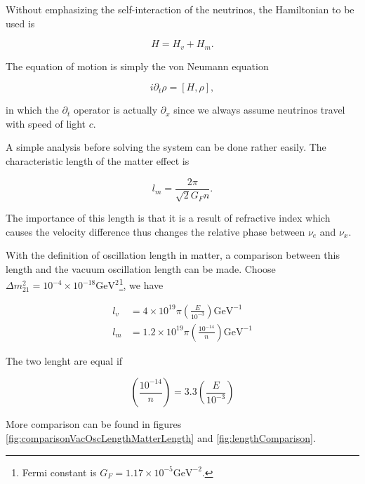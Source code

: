 \documentclass{tufte-handout}
\begin{document}
Without emphasizing the self-interaction of the neutrinos, the Hamiltonian to be used is

\begin{equation}
H = H_v + H_m.
\end{equation}

The equation of motion is simply the von Neumann equation

\begin{equation}
i \partial_t \rho = \left[ H , \rho\right],
\end{equation}

in which the $\partial_t$ operator is actually $\partial_x$ since we always assume neutrinos travel with speed of light $c$.

A simple analysis before solving the system can be done rather easily. The characteristic length of the matter effect is

\begin{equation*}
l_m = \frac{2\pi}{\sqrt{2}G_F n} .
\end{equation*}

The importance of this length is that it is a result of refractive index which causes the velocity difference thus changes the relative phase between $\nu_e$ and $\nu_x$.\cite{wolfensteinprd1979}


With the definition of oscillation length in matter, a comparison between this length and the vacuum oscillation length can be made. Choose $\Delta m_{21}^2=10^{-4}\times 10^{-18}\mathrm{GeV^{2}}$\footnote{Fermi constant is $G_F=1.17\times 10^{-5}\mathrm{GeV^{-2}}$.}, we have

\begin{align*}
l_v &= 4\times 10^{19}\pi \left( \frac{E}{10^{-3}} \right) \mathrm{GeV^{-1}} \\
l_m &=  1.2\times 10^{19}\pi \left( \frac{10^{-14}}{n} \right) \mathrm{GeV^{-1}}
\end{align*}

The two lenght are equal if

\begin{equation*}
\left(\frac{10^{-14}}{n} \right) = 3.3 \left( \frac{E}{10^{-3}}\right)
\end{equation*}

More comparison can be found in figures \ref{fig:comparisonVacOscLengthMatterLength} and \ref{fig:lengthComparison}.
\end{document}
